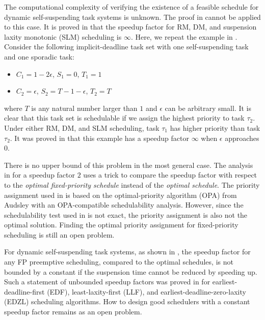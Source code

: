 The computational complexity of verifying the existence of a feasible schedule for dynamic self-suspending task systems is unknown. The proof in \cite{Ridouard_2004} cannot be applied to this case. 
It is proved in \cite{huangpass:dac2015} that the speedup factor for RM, DM, and suspension laxity monotonic (SLM) scheduling is $\infty$. Here, we repeat the example in \cite{huangpass:dac2015}. Consider the following implicit-deadline task set with one self-suspending task and one sporadic task:
\begin{itemize}
 \setlength\itemsep{0em}
\item $C_1=1-2\epsilon$, $S_1=0$, $T_1=1$
\item  $C_2=\epsilon$, $S_2=T-1-\epsilon$, $T_2=T$
\end{itemize}
where $T$ is any natural number larger than $1$ and $\epsilon$ can be arbitrary small. It is clear that this task set is schedulable if we assign the highest priority to
task $\tau_2$. Under either RM, DM, and SLM scheduling, task $\tau_1$ has higher priority than task $\tau_2$. It was proved in \cite{huangpass:dac2015} that this example has a speedup factor $\infty$ when $\epsilon$ approaches $0$.


There is no upper bound of this problem in the most general case. The analysis in \cite{huangpass:dac2015} for a speedup factor $2$ uses a trick to compare the speedup factor with respect to the \emph{optimal fixed-priority schedule} instead of the \emph{optimal schedule}.  The priority assignment used in \cite{huangpass:dac2015} is based on the optimal-priority algorithm (OPA) from Audsley \cite{audsley-1993} with an OPA-compatible schedulability analysis. However, since the schedulability test used in \cite{huangpass:dac2015} is not exact, the priority assignment is also not the optimal solution.  Finding the optimal priority assignment for fixed-priority scheduling is still an open problem.

For dynamic self-suspending task systems, as shown in \cite{RTSS2016-suspension}, the speedup factor for any FP preemptive scheduling, compared to the optimal   schedules, is not bounded by a constant if the suspension time cannot be reduced by speeding up. Such a statement of unbounded speedup factors was proved in \cite{RTSS2016-suspension} for earliest-deadline-first (EDF), least-laxity-first (LLF), and earliest-deadline-zero-laxity (EDZL) scheduling algorithms. How to design good schedulers with a constant speedup factor remains as an open problem.





